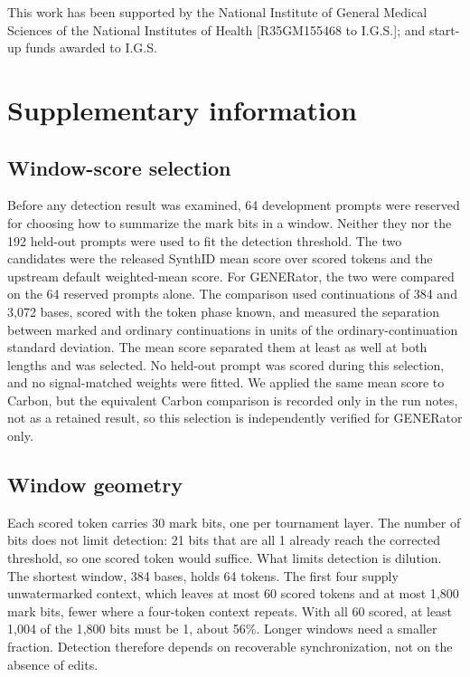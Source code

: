 \documentclass[10pt,twocolumn]{article}
\begin{document}
This work has been supported by the National Institute of General Medical Sciences of the National
Institutes of Health [R35GM155468 to I.G.S.]; and start-up funds awarded to I.G.S.

\begingroup
\small
\raggedright
\balance


\endgroup

\clearpage
\section*{Supplementary information}
\setcounter{subsection}{0}
\renewcommand{\thesubsection}{S\arabic{subsection}}
\renewcommand{\theHsubsection}{S\arabic{subsection}}
\setcounter{figure}{0}
\renewcommand{\thefigure}{S\arabic{figure}}
\renewcommand{\theHfigure}{S\arabic{figure}}
\setcounter{table}{0}
\renewcommand{\thetable}{S\arabic{table}}
\renewcommand{\theHtable}{S\arabic{table}}

\subsection{Window-score selection}
\label{supp:selection}

Before any detection result was examined, 64 development prompts were reserved for choosing how to
summarize the mark bits in a window. Neither they nor the 192 held-out prompts were used to fit the
detection threshold. The two candidates were the released SynthID mean score over scored tokens and
the upstream default weighted-mean score. For GENERator, the two were compared on the 64 reserved
prompts alone. The comparison used continuations of 384 and 3{,}072 bases, scored with the token
phase known, and measured the separation between marked and ordinary continuations in units of the
ordinary-continuation standard deviation. The mean score separated them at least as well at both
lengths and was selected. No held-out prompt was scored during this selection, and no
signal-matched weights were fitted. We applied the same mean score to Carbon, but the equivalent
Carbon comparison is recorded only in the run notes, not as a retained result, so this selection is
independently verified for GENERator only.

\subsection{Window geometry}
\label{supp:geometry}

Each scored token carries 30 mark bits, one per tournament layer. The number of bits does not
limit detection: 21 bits that are all 1 already reach the corrected threshold, so one scored token
would suffice. What limits detection is dilution. The shortest window, 384 bases, holds 64 tokens.
The first four supply unwatermarked context, which leaves at most 60 scored tokens and at most
1{,}800 mark bits, fewer where a four-token context repeats. With all 60 scored, at least 1{,}004 of
the 1{,}800 bits must be 1, about 56\%. Longer windows need a smaller fraction. Detection therefore
depends on recoverable synchronization, not on the absence of edits.
\end{document}
